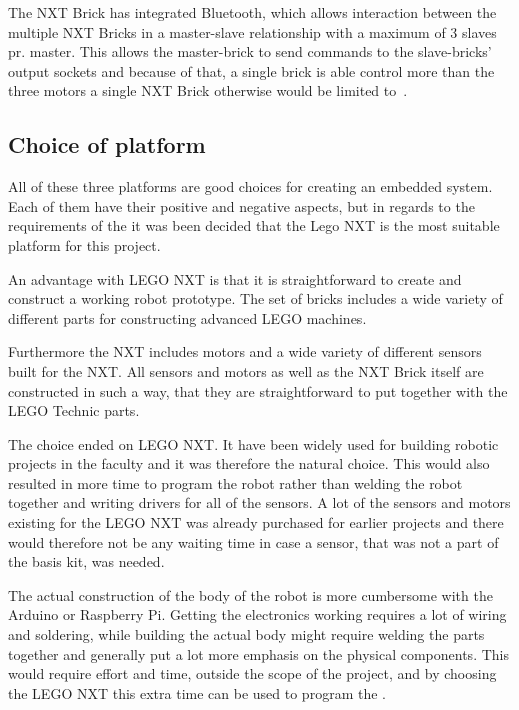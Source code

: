 The NXT Brick has integrated Bluetooth, which allows interaction between the multiple NXT Bricks in a master-slave relationship with a maximum of 3 slaves pr. master. This allows the master-brick to send commands to the slave-bricks' output sockets and because of that, a single brick is able control more than the three motors a single NXT Brick otherwise would be limited to~\citep{lego_edu_guide}.

\subsection{Choice of platform}
All of these three platforms are good choices for creating an embedded system. Each of them have their positive and negative aspects, but in regards to the requirements of the \projname{} it was been decided that the Lego NXT is the most suitable platform for this project.

An advantage with LEGO NXT is that it is straightforward to create and construct a working robot prototype. The set of bricks includes a wide variety of different parts for constructing advanced LEGO machines. 

Furthermore the NXT includes motors and a wide variety of different sensors built for the NXT. All sensors and motors as well as the NXT Brick itself are constructed in such a way, that they are straightforward to put together with the LEGO Technic parts.

The choice ended on LEGO NXT. It have been widely used for building robotic projects in the faculty and it was therefore the natural choice. This would also resulted in more time to program the robot rather than welding the robot together and writing drivers for all of the sensors. A lot of the sensors and motors existing for the LEGO NXT was already purchased for earlier projects and there would therefore not be any waiting time in case a sensor, that was not a part of the basis kit, was needed.

The actual construction of the body of the robot is more cumbersome with the Arduino or Raspberry Pi. Getting the electronics working requires a lot of wiring and soldering, while building the actual body might require welding the parts together and generally put a lot more emphasis on the physical components. This would require effort and time, outside the scope of the project, and by choosing the LEGO NXT this extra time can be used to program the \projname{}.



